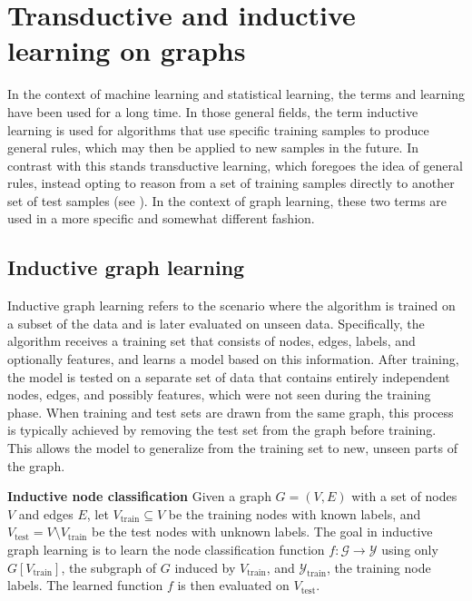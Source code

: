 \section{Transductive and inductive learning on graphs}

In the context of machine learning and statistical learning, the terms  and  learning have been used for a long time. In those general fields, the term inductive learning is used for algorithms that use specific training samples to produce general rules, which may then be applied to new samples in the future. In contrast with this stands transductive learning, which foregoes the idea of general rules, instead opting to reason from a set of training samples directly to another set of test samples (see \cite{vapnik_nature_1995}). In the context of graph learning, these two terms are used in a more specific and somewhat different fashion.


\subsection{Inductive graph learning}

Inductive graph learning refers to the scenario where the algorithm is trained on a subset of the data and is later evaluated on unseen data. Specifically, the algorithm receives a training set that consists of nodes, edges, labels, and optionally features, and learns a model based on this information. After training, the model is tested on a separate set of data that contains entirely independent nodes, edges, and possibly features, which were not seen during the training phase. When training and test sets are drawn from the same graph, this process is typically achieved by removing the test set from the graph before training. This allows the model to generalize from the training set to new, unseen parts of the graph.

\begin{example}\textbf{Inductive node classification}
	Given a graph \( G = \left( V, E \right) \) with a set of nodes \( V \) and edges \( E \), let \( V_\mathrm{train} \subseteq V \) be the training nodes with known labels, and \( V_\mathrm{test} = V \setminus V_\mathrm{train} \) be the test nodes with unknown labels. The goal in inductive graph learning is to learn the node classification function \( f: \mathcal{G} \rightarrow \mathcal{Y} \) using only \( G \left[ V_\mathrm{train} \right] \), the subgraph of \( G \) induced by \( V_\mathrm{train} \), and \( \mathcal{Y}_\mathrm{train} \), the training node labels. The learned function \( f \) is then evaluated on \( V_\mathrm{test} \).
\end{example}

